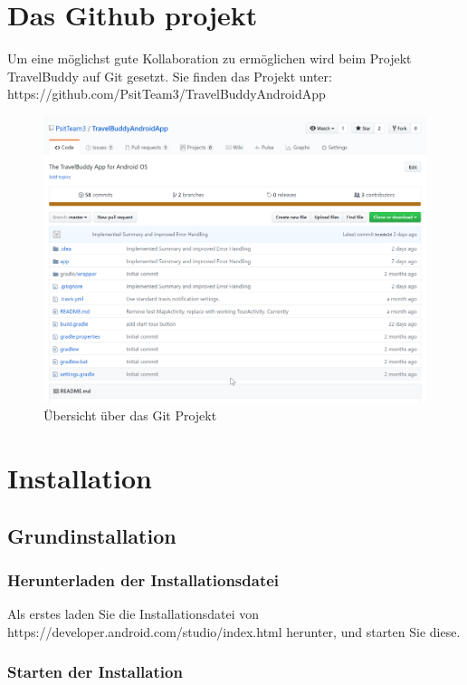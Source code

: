 \documentclass[a4paper,10pt,xetex]{article}
\begin{document}
\section{Das Github projekt}
Um eine möglichst gute Kollaboration zu ermöglichen wird beim Projekt TravelBuddy auf Git gesetzt.
Sie finden das Projekt unter: https://github.com/PsitTeam3/TravelBuddyAndroidApp
\begin{figure}
  \centering
  \includegraphics[width=\textwidth]{Installation/0-0}
  \caption{Übersicht über das Git Projekt}
\end{figure}

\section{Installation}

\subsection{Grundinstallation}
\subsubsection{Herunterladen der Installationsdatei}
Als erstes laden Sie die Installationsdatei von https://developer.android.com/studio/index.html herunter, und starten Sie diese.
\subsubsection{Starten der Installation}
\end{document}
